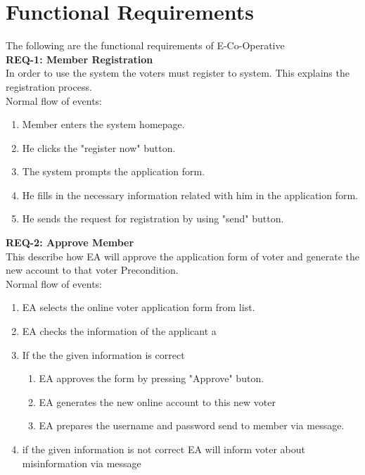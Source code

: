 \documentclass[12pt,a4paper,oneside]{report}
\begin{document}
\section{Functional Requirements}
The following are the functional requirements of E-Co-Operative\\
\textbf{REQ-1: Member Registration}\\
           \hspace{1.9 in} In order to use the system the voters must register to system. This explains the registration process. \\
           \newpage
           Normal flow of events: 
           \begin{enumerate}
           \item  Member enters the system homepage. 
           \item He clicks the "register now" button.
           \item The system prompts the application form. 
           \item He fills in the necessary information related with him in the application form. 
           \item He sends the request for registration by using "send" button. 
           \end{enumerate}
    \textbf{REQ-2: Approve Member }\\  
                    This describe how EA will approve the application form of voter and generate the new account to that voter Precondition.\\
                    Normal flow of events: 
                    \begin{enumerate}
                    \item EA selects the online voter application form from list. 
                    \item  EA checks the information of the applicant a
                  \item   If the the given information is correct 
                  \begin{enumerate}
                  \item EA approves the form by pressing "Approve" buton.
                  \item EA generates the new online account to this new voter 
                  \item EA prepares the username  and password send to member via message.
                  \end{enumerate}
                  \item if the given information is not correct  EA will inform voter about misinformation via message    
                    \end{enumerate}
\end{document}
